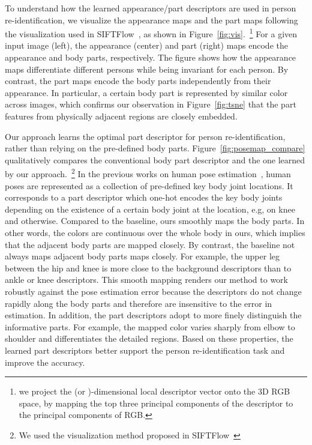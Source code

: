 \documentclass{llncs}
\begin{document}
To understand how the learned appearance/part descriptors are used in person re-identification, we visualize the appearance maps  and the part maps  following the visualization used in SIFTFlow~\cite{siftflow}, as shown in Figure~\ref{fig:vis}.~\footnote{we project the (or )-dimensional local descriptor vector onto the 3D RGB space, by mapping the top three principal components of the descriptor to the principal components of RGB.} For a given input image (left), the appearance (center) and part (right) maps encode the appearance and body parts, respectively. The figure shows how the appearance maps differentiate different persons while being invariant for each person.
By contrast, the part maps encode the body parts independently from their appearance. In particular, a certain body part is represented by similar color across images, which confirms our observation in Figure~\ref{fig:tsne} that the part features from physically adjacent regions are closely embedded.

Our approach learns the optimal part descriptor for person re-identification, rather than relying on the pre-defined body parts. Figure~\ref{fig:posemap_compare} qualitatively compares the conventional body part descriptor and the one learned by our approach.~\footnote{We used the visualization method proposed in SIFTFlow~\cite{siftflow}} In the previous works on human pose estimation~\cite{conf/cvpr/wei16,conf/cvpr/cao17,hourglass}, human poses are represented as a collection of pre-defined key body joint locations. It corresponds to a part descriptor which one-hot encodes the key body joints depending on the existence of a certain body joint at the location, e.g,  on knee and  otherwise. 
Compared to the baseline, ours smoothly maps the body parts. In other words, the colors are continuous over the whole body in ours, which implies that the adjacent body parts are mapped closely. By contrast, the baseline not always maps adjacent body parts maps closely.  For example, the upper leg between the hip and knee is more close to the background descriptors than to ankle or knee descriptors. This smooth mapping renders our method to work robustly against the pose estimation error because the descriptors do not change rapidly along the body parts and therefore are insensitive to the error in estimation. In addition, the part descriptors adopt to more finely distinguish the informative parts. For example, the mapped color varies sharply from elbow to shoulder and differentiates the detailed regions. Based on these properties, the learned part descriptors better support the person re-identification task and improve the accuracy.
\end{document}
